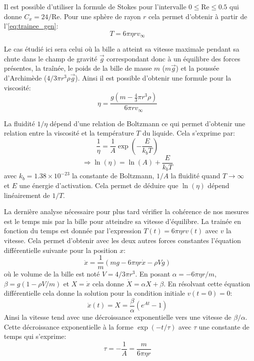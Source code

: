 Il est possible d'utiliser la formule de Stokes pour l'intervalle $0 \leq \mathrm{Re} \leq 0.5$ qui donne \hbox{$C_x = 24/\mathrm{Re}$}. Pour une sphère de rayon $r$ cela permet d'obtenir à partir de l'\autoref{eq:trainee_gen}:
\begin{equation}
    T = 6 \pi \eta r v_\infty
    \label{eq:trainee_stokes}
\end{equation}

Le cas étudié ici sera celui où la bille a atteint sa vitesse maximale pendant sa chute dans le champ de gravité $\vec{g}$ correspondant donc à un équilibre des forces présentes, la traînée, le poids de la bille de masse $m$ ($m\vec{g}$) et la poussée d'Archimède ($4/3 \pi r^3 \rho \vec{g}$). Ainsi il est possible d'obtenir une formule pour la viscosité:
\begin{equation}
    \eta = \frac{g(m-\frac{4}{3}\pi r^3 \rho)}{6\pi r v_\infty}
    \label{eq:viscosite}
\end{equation}

La fluidité $1/\eta$ dépend d'une relation de Boltzmann ce qui permet d'obtenir une relation entre la viscosité et la température $T$ du liquide. Cela s'exprime par:
\begin{equation}
    \frac{1}{\eta} = \frac{1}{A} \exp\left(-\frac{E}{k_b T}\right)
\end{equation}
\begin{equation}
    \Rightarrow \ln(\eta) = \ln(A) + \frac{E}{k_b T}
    \label{eq:ln_relation_boltzmann}
\end{equation}
avec $k_b = 1.38 \times 10^{-23}$ la constante de Boltzmann, $1/A$ la fluidité quand $T \to \infty$ et $E$ une énergie d'activation. Cela permet de déduire que $\ln(\eta)$ dépend linéairement de $1/T$.

La dernière analyse nécessaire pour plus tard vérifier la cohérence de nos mesures est le temps mis par la bille pour atteindre sa vitesse d'équilibre. La trainée en fonction du temps est donnée par l'expression $T(t) = 6\pi \eta r v(t)$ avec $v$ la vitesse. Cela permet d'obtenir avec les deux autres forces constantes l'équation différentielle suivante pour la position $x$:
\begin{equation}
    \ddot{x} = \frac{1}{m}(mg - 6\pi \eta r \dot{x} - \rho V g)
\end{equation}
où le volume de la bille est noté $V = 4/3 \pi r^3$. En posant $\alpha = -6\pi \eta r / m$, $\beta = g(1-\rho V/m)$ et $X = \dot{x}$ cela donne $\dot{X} = \alpha X + \beta$. En résolvant cette équation différentielle cela donne la solution pour la condition initiale $v(t=0)=0$:
\begin{equation}
    \dot{x}(t) = X = \frac{\beta}{\alpha}(e^{At} - 1)
\end{equation}
Ainsi la vitesse tend avec une décroissance exponentielle vers une vitesse de $\beta/\alpha$. Cette décroissance exponentielle à la forme $\exp(-t/\tau)$ avec $\tau$ une constante de temps qui s'exprime:
\begin{equation}
    \tau = -\frac{1}{A} = \frac{m}{6\pi \eta r}
    \label{eq:constante_temps}
\end{equation}
